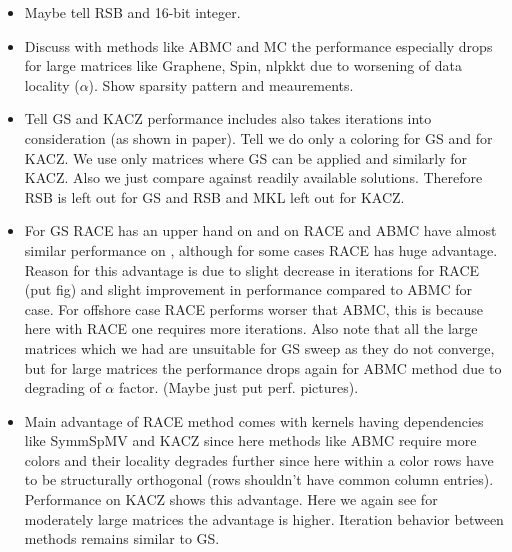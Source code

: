 \begin{itemize}
	\item Maybe tell RSB and 16-bit integer.
	\item Discuss with methods like ABMC and MC the performance especially drops for large matrices like Graphene, Spin, nlpkkt due to worsening of data locality ($\alpha$). Show sparsity pattern and \LIKWID meaurements. 
	\item Tell GS and KACZ performance includes also takes iterations into consideration (as shown in paper). Tell we do only a \DONE coloring for GS and \DTWO for KACZ. We use only matrices where GS can be applied and similarly for KACZ. Also we just compare against readily available solutions. Therefore RSB is left out for GS and RSB and MKL left out for KACZ.
	\item For GS RACE has an upper hand on \IVB and on \SKX RACE and ABMC have almost similar performance on \SKX, although for some cases RACE has huge advantage. Reason for this advantage is due to slight decrease in iterations for RACE (put fig) and slight improvement in performance compared to ABMC for \DONE case. For offshore case RACE performs worser that ABMC, this is because here with RACE one requires more iterations. Also note that all the large matrices which we had are unsuitable for GS sweep as they do not converge, but for large matrices the performance drops again for ABMC method due to degrading of $\alpha$ factor. (Maybe just put perf. pictures).
	\item Main advantage of RACE method comes with kernels having \DTWO dependencies like SymmSpMV and KACZ since here methods like ABMC require more colors and their locality degrades further since here within a color rows have to be structurally orthogonal (rows shouldn't have common column entries). Performance on KACZ shows this advantage. Here we again see for moderately large matrices the advantage is higher. Iteration behavior between methods remains similar to GS.
\end{itemize} 
     
